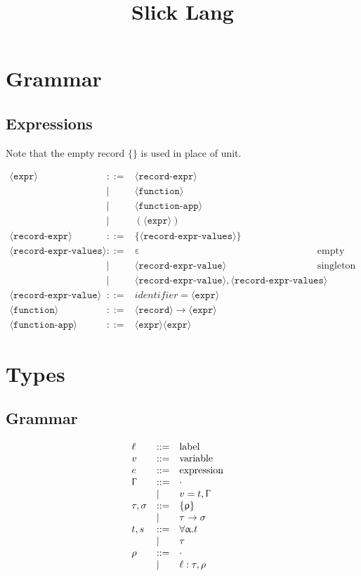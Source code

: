 \documentclass{article}
\title{Slick Lang}
\date{}
\author{}
\newcommand{\bnfvar}[1]{\langle \texttt{#1} \rangle}
\newcommand{\define}{::=}
\newcommand{\arrow}{\to}
\newcommand{\rcd}[1]{\{#1\}}
\newcommand{\emptyrow}{\cdot}
\newcommand{\ctx}{\Upgamma}
\begin{document}
\maketitle

\section{Grammar}

\subsection{Expressions}

Note that the empty record \(\{\}\) is used in place of unit.

\[
\begin{array}{lllrl}
  \bnfvar {expr} & \define & \bnfvar {record-expr} & \\
  & | & \bnfvar {function} & \\
  & | & \bnfvar {function-app} & \\
  & | & ( \bnfvar {expr} ) & \\
  \bnfvar {record-expr} & \define & \{ \bnfvar {record-expr-values} \} & \\
  \bnfvar {record-expr-values} & \define & \upepsilon & \text{empty} \\
  & | & \bnfvar {record-expr-value} & \text{singleton} \\
  & | & \bnfvar {record-expr-value} , \bnfvar {record-expr-values} & \\
  \bnfvar {record-expr-value} & \define & identifier = \bnfvar {expr} & \\
  \bnfvar {function} & \define & \bnfvar {record} \arrow \bnfvar {expr} & \\
  \bnfvar {function-app} & \define & \bnfvar {expr} \bnfvar {expr} & 
\end{array}
\]

\section{Types}

\subsection{Grammar}

\[
  \begin{array}{lllrl}
    \ell & \define & \text{label} & \\
    v & \define & \text{variable} & \\
    e & \define & \text{expression} & \\
    \ctx & \define & \cdot & \\
    & | & v = t, \ctx & \\
    \tau, \sigma & \define & \rcd \uprho &  \\
    & | & \tau \arrow \sigma & \\
    t, s & \define & \forall \upalpha. t & \\
    & | & \tau & \\
    \rho & \define & \emptyrow & \\
    & | & \ell : \tau, \rho &
  \end{array}
\]
\end{document}

